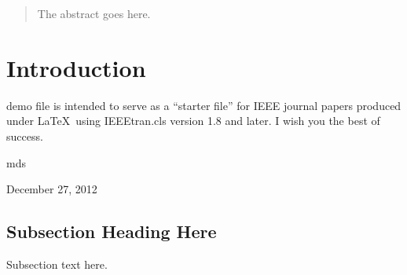 \documentclass[journal]{IEEEtran}
\begin{document}




\maketitle

\begin{abstract}
The abstract goes here.
\end{abstract}

%
\IEEEpeerreviewmaketitle



\section{Introduction}
% 
% 
% 
% 
 demo file is intended to serve as a ``starter file''
for IEEE journal papers produced under \LaTeX\ using
IEEEtran.cls version 1.8 and later.
I wish you the best of success.

\hfill mds
 
\hfill December 27, 2012

\subsection{Subsection Heading Here}
Subsection text here.
\end{document}
